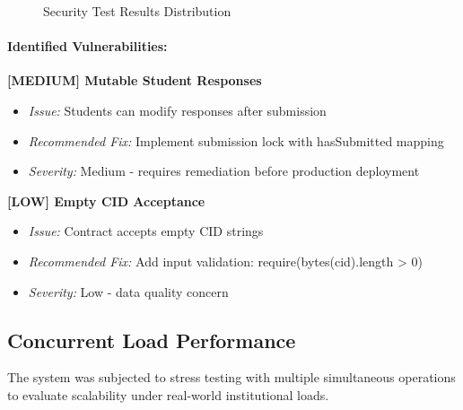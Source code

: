 \documentclass[12pt,a4paper]{article}
\begin{document}
\begin{figure}[H]
    \centering
    \caption{Security Test Results Distribution}
    \label{fig:security-results}
\end{figure}

\paragraph{Identified Vulnerabilities:}

\textbf{[MEDIUM] Mutable Student Responses}
\begin{itemize}
    \item \textit{Issue:} Students can modify responses after submission
    \item \textit{Recommended Fix:} Implement submission lock with hasSubmitted mapping
    \item \textit{Severity:} Medium - requires remediation before production deployment
\end{itemize}

\textbf{[LOW] Empty CID Acceptance}
\begin{itemize}
    \item \textit{Issue:} Contract accepts empty CID strings
    \item \textit{Recommended Fix:} Add input validation: require(bytes(cid).length > 0)
    \item \textit{Severity:} Low - data quality concern
\end{itemize}

\subsection{Concurrent Load Performance}

The system was subjected to stress testing with multiple simultaneous operations to evaluate scalability under real-world institutional loads.
\end{document}
